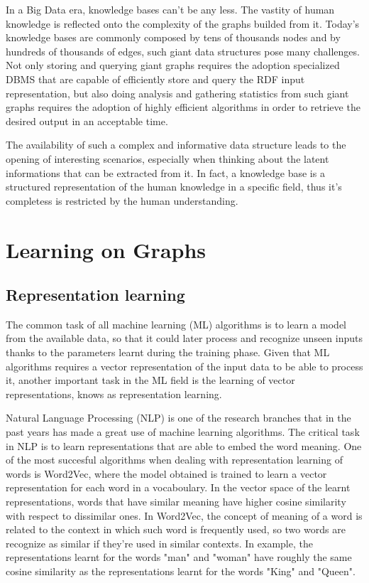 \documentclass[%
    corpo=13.5pt,
    twoside,
    oldstyle,
    tipotesi=magistrale,
    greek,
    evenboxes
]{toptesi}
\begin{document}
In a Big Data era, knowledge bases can't be any less. The vastity of human
knowledge is reflected onto the complexity of the graphs
builded from it. Today's knowledge bases are commonly composed by tens of
thousands nodes and by hundreds of thousands of edges, such giant data
structures pose many challenges.
Not only storing and querying giant graphs requires the adoption
specialized DBMS that are capable of efficiently store and query the RDF
input representation, but also doing analysis and gathering statistics from
such giant graphs requires the adoption of highly efficient algorithms in
order to retrieve the desired output in an acceptable time.

The availability of such a complex and informative data structure leads
to the opening of interesting scenarios, especially when thinking about
the latent informations that can be extracted from it. In
fact, a knowledge base is a structured representation of the
human knowledge in a specific field, thus it's completess is restricted
by the human understanding.


\section{Learning on Graphs}

\subsection{Representation learning}


The common task of all machine learning (ML) algorithms is to learn a model from
the available data, so that it could later process and recognize unseen inputs
thanks to the parameters learnt during the training phase. Given that
ML algorithms requires a vector representation of the input data to be able
to process it, another important task in the ML field is the learning of vector
representations, knows as representation learning.

Natural Language Processing (NLP) is one of the research branches that in
the past years has made a great use of machine learning algorithms. The
critical task in NLP is to learn representations that are able to embed
the word meaning. One of the most succesful algorithms when
dealing with representation learning of words is Word2Vec, where the model
obtained is trained to learn a vector representation for each word in a
vocaboulary. In the vector space of the learnt representations, words that
have similar meaning have higher cosine similarity with respect to
dissimilar ones. In Word2Vec, the concept of meaning of a word is
related to the context in which such word is frequently used, so two
words are recognize as similar if they're used in similar contexts. In
example, the representations learnt for the words "man" and "woman" have
roughly the same cosine similarity as the representations learnt for the
words "King" and "Queen".
\end{document}
